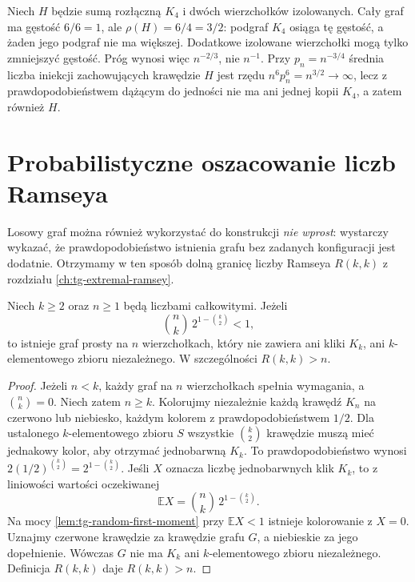 \begin{przyklad}
Niech $H$ będzie sumą rozłączną $K_4$ i dwóch
wierzchołków izolowanych. Cały graf ma gęstość
$6/6=1$, ale $\rho(H)=6/4=3/2$:
podgraf $K_4$ osiąga tę gęstość, a żaden jego
podgraf nie ma większej. Dodatkowe izolowane
wierzchołki mogą tylko zmniejszyć gęstość.
Próg wynosi więc $n^{-2/3}$, nie $n^{-1}$.
Przy $p_n=n^{-3/4}$ średnia liczba iniekcji
zachowujących krawędzie $H$ jest rzędu
$n^6p_n^6=n^{3/2}\to\infty$, lecz z
prawdopodobieństwem dążącym do jedności
nie ma ani jednej kopii $K_4$, a zatem również $H$.
\end{przyklad}

\section{Probabilistyczne oszacowanie liczb Ramseya}
\label{sec:tg-random-ramsey}

Losowy graf można
również wykorzystać
do konstrukcji
\emph{nie wprost}:
wystarczy wykazać,
że prawdopodobieństwo
istnienia grafu
bez zadanych
konfiguracji jest
dodatnie. Otrzymamy
w ten sposób
dolną granicę
liczby Ramseya
$R(k,k)$ z
rozdziału
\ref{ch:tg-extremal-ramsey}.

\begin{twierdzenie}
\label{thm:tg-random-ramsey-bound}
Niech $k\geq2$
oraz $n\geq1$
będą liczbami
całkowitymi.
Jeżeli
\[
\binom nk\,2^{1-\binom k2}<1,
\]
to istnieje graf
prosty na $n$
wierzchołkach,
który nie zawiera
ani kliki $K_k$,
ani $k$-elementowego
zbioru niezależnego.
W szczególności
$R(k,k)>n$.
\end{twierdzenie}
\begin{proof}
Jeżeli $n<k$, każdy graf na $n$ wierzchołkach
spełnia wymagania, a $\binom nk=0$.
Niech zatem $n\geq k$.
Kolorujmy niezależnie
każdą krawędź
$K_n$ na czerwono
lub niebiesko,
każdym kolorem
z prawdopodobieństwem
$1/2$. Dla ustalonego
$k$-elementowego
zbioru $S$ wszystkie
$\binom k2$ krawędzie
muszą mieć jednakowy
kolor, aby otrzymać
jednobarwną $K_k$.
To prawdopodobieństwo
wynosi
$2(1/2)^{\binom k2}
=2^{1-\binom k2}$.
Jeśli $X$ oznacza
liczbę jednobarwnych
klik $K_k$, to
z liniowości wartości
oczekiwanej
\[
\mathbb EX=
\binom nk\,2^{1-\binom k2}.
\]
Na mocy
\ref{lem:tg-random-first-moment}
przy $\mathbb EX<1$
istnieje kolorowanie
z $X=0$. Uznajmy
czerwone krawędzie
za krawędzie grafu $G$,
a niebieskie za jego
dopełnienie. Wówczas
$G$ nie ma $K_k$
ani $k$-elementowego
zbioru niezależnego.
Definicja $R(k,k)$
daje $R(k,k)>n$.
\end{proof}

